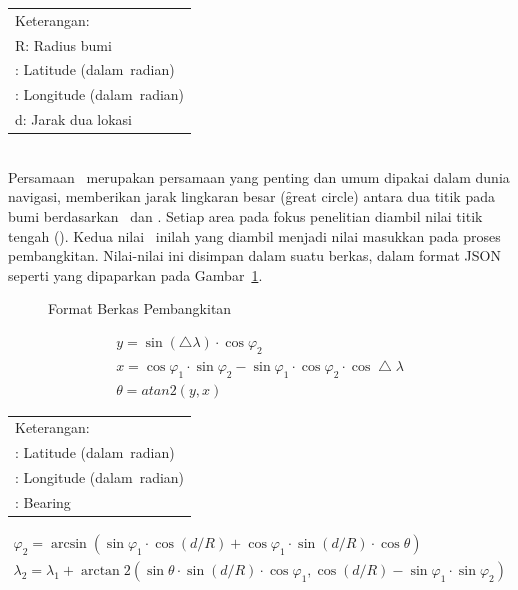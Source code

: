 \begin{tabular}{l}
	Keterangan: \\
	R: Radius bumi \\
	\varphi: Latitude (dalam~radian) \\
	\lambda: Longitude (dalam~radian) \\
	d: Jarak dua lokasi \\
\end{tabular} \\

Persamaan \haversine~merupakan persamaan yang penting dan umum dipakai dalam
dunia navigasi, memberikan jarak lingkaran besar (\f{great circle}) antara dua
titik pada bumi berdasarkan \latitude~dan \longitude. Setiap area pada fokus
penelitian diambil nilai titik tengah (\centroid). Kedua nilai \centroid~inilah
yang diambil menjadi nilai masukkan pada proses pembangkitan. Nilai-nilai ini
disimpan dalam suatu berkas, dalam format JSON seperti yang dipaparkan pada
Gambar~\ref{fig:berkas_map}.

\noindent
\begin{figure}
	\centering
	\lstset{basicstyle=\ttfamily,frame=single,language=javascript}
	
	\caption{Format Berkas Pembangkitan}
\label{fig:berkas_map}
\end{figure}

\noindent
\begin{equation}
	\label{eq:bearing}
	\begin{split}
		y = \sin(\bigtriangleup\lambda) \cdot \cos\varphi_2 \\
		x = \cos\varphi_1 \cdot \sin\varphi_2 - \sin\varphi_1 \cdot \cos\varphi_2
		\cdot \cos\bigtriangleup\lambda \\
		\theta = atan2(y, x)
	\end{split}
\end{equation}

\begin{tabular}{l}
	Keterangan: \\
	\varphi: Latitude (dalam~radian) \\
	\lambda: Longitude (dalam~radian) \\
	\theta: Bearing\\
\end{tabular}

\noindent
\begin{equation}
	\label{eq:destination}
	\begin{split}
		\varphi_2 = \arcsin(\sin\varphi_1 \cdot \cos(d/R) + \cos\varphi_1 \cdot
		\sin(d/R) \cdot \cos\theta) \\
		\lambda_2 = \lambda_1 + \arctan2(\sin\theta \cdot \sin(d/R) \cdot
		\cos\varphi_1, \cos(d/R) - \sin\varphi_1 \cdot \sin\varphi_2)
	\end{split}
\end{equation}

